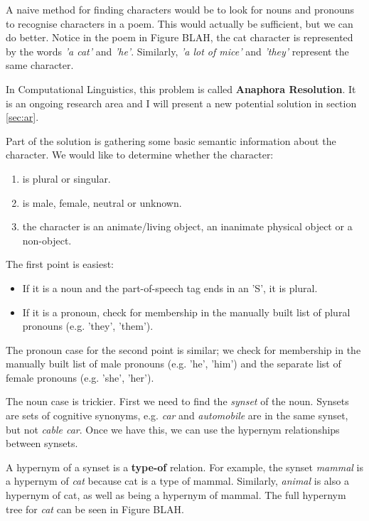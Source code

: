 A naive method for finding characters would be to look for nouns and pronouns to recognise characters in a poem. This would actually be sufficient, but we can do better. Notice in the poem in Figure BLAH, the cat character is represented by the words \textit{'a cat'} and \textit{'he'}. Similarly, \textit{'a lot of mice'} and \textit{'they'} represent the same character.

In Computational Linguistics, this problem is called \textbf{Anaphora Resolution}. It is an ongoing research area and I will present a new potential solution in section \ref{sec:ar}.

Part of the solution is gathering some basic semantic information about the character. We would like to determine whether the character:

\begin{enumerate}
\item{is plural or singular.}
\item{is male, female, neutral or unknown.}
\item{the character is an animate/living object, an inanimate physical object or a non-object.}
\end{enumerate}

The first point is easiest:
\begin{itemize}
\item{If it is a noun and the part-of-speech tag ends in an 'S', it is plural.}
\item{If it is a pronoun, check for membership in the manually built list of plural pronouns (e.g. 'they', 'them').}
\end{itemize}

The pronoun case for the second point is similar; we check for membership in the manually built list of male pronouns (e.g. 'he', 'him') and the separate list of female pronouns (e.g. 'she', 'her'). 

The noun case is trickier. First we need to find the \textit{synset} of the noun. Synsets are sets of cognitive synonyms, e.g. \textit{car} and \textit{automobile} are in the same synset, but not \textit{cable car}. Once we have this, we can use the hypernym relationships between synsets.

A hypernym of a synset is a \textbf{type-of} relation. For example, the synset \textit{mammal} is a hypernym of \textit{cat} because cat is a type of mammal. Similarly, \textit{animal} is also a hypernym of cat, as well as being a hypernym of mammal. The full hypernym tree for \textit{cat} can be seen in Figure BLAH. 

